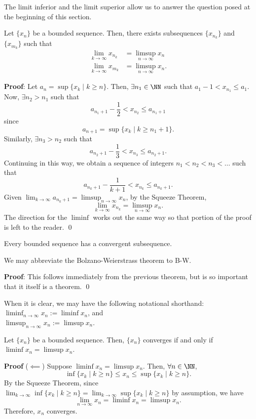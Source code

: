 The limit inferior and the limit superior allow us to answer the question posed at the beginning of this section.
\begin{theorem}
Let $\{x_n\}$ be a bounded sequence. Then, there exists subsequences $\{x_{n_k}\}$ and $\{x_{m_k}\}$ such that 
\begin{align*}
    \lim_{k\to \infty} x_{n_k} &= \limsup_{n\to \infty} x_n \\
    \lim_{k\to \infty} x_{m_k} &= \limsup_{n\to \infty} x_n.
\end{align*}
\end{theorem}
\textbf{Proof}: Let $a_n = \sup\{x_k \mid k\geq n\}.$ Then, $\exists n_1 \in \NN$ such that $a_1 -1 < x_{n_1} \leq a_1$. Now, $\exists n_2>n_1$ such that
\[
a_{n_1+1}-\frac{1}{2} < x_{n_2} \leq a_{n_1+1}
\]
since 
\[
a_{n+1} = \sup \{x_k \mid k\geq n_1 +1\}.
\]
Similarly, $\exists n_3>n_2$ such that
\[
a_{n_2+1}-\frac{1}{3} < x_{n_3} \leq a_{n_2+1}.
\]
Continuing in this way, we obtain a sequence of integers $n_1< n_2 < n_3< \dots$ such that 
\[
a_{n_k+1} - \frac{1}{k+1} < x_{n_k} \leq a_{n_k+1}.
\]
Given $\lim_{k\to \infty} a_{n_k +1} = \limsup_{n\to \infty} x_n$, by the Squeeze Theorem, 
\[
\lim_{k\to \infty} x_{n_k} = \limsup_{n\to \infty} x_n.
\]
The direction for the $\liminf$ works out the same way so that portion of the proof is left to the reader. \qed 

\begin{theorem}
Every bounded sequence has a convergent subsequence.
\end{theorem}
\begin{remark}
We may abbreviate the Bolzano-Weierstrass theorem to B-W.
\end{remark}

\noindent\textbf{Proof}: This follows immediately from the previous theorem, but is so important that it itself is a theorem. \qed 

\begin{notation}
When it is clear, we may have the following notational shorthand: $\liminf_{n\to \infty} x_n := \liminf x_n$, and \\$\limsup_{n\to \infty} x_n := \limsup x_n$.
\end{notation}

\begin{theorem}
Let $\{x_n\}$ be a bounded sequence. Then, $\{x_n\}$ converges if and only if $\liminf x_n = \limsup x_n.$
\end{theorem}
\textbf{Proof} ($\impliedby$) Suppose $\liminf x_n = \limsup x_n$. Then, $\forall n\in \NN$,
\[
\inf\{x_k \mid k \geq n\} \leq x_n \leq \sup \{x_k\mid k\geq n\}.
\]
By the Squeeze Theorem, since $\lim_{k\to \infty} \inf \{x_k \mid k\geq n\} = \lim_{k\to \infty} \sup \{x_k \mid k\geq n\}$ by assumption, we have 
\[
\lim_{n\to \infty} x_n = \liminf x_n = \limsup x_n.
\]
Therefore, $x_n$ converges. 


